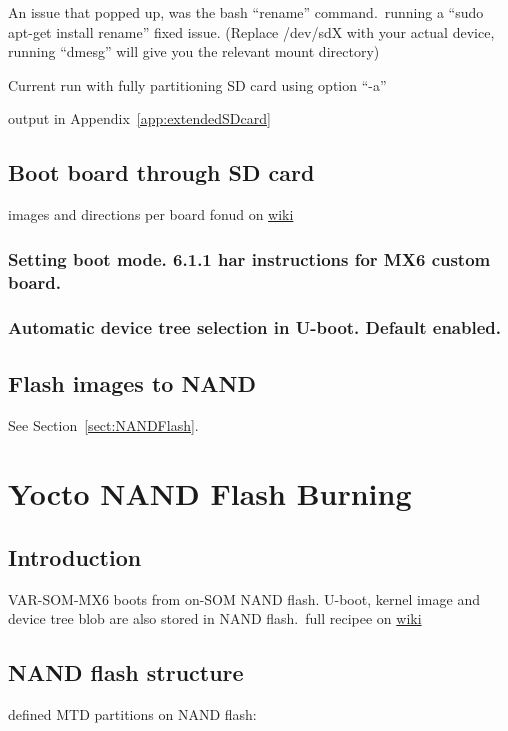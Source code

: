 \documentclass[10pt]{article}
\begin{document}
An issue that popped up, was the bash ``rename'' command.\ running a ``sudo apt-get install rename'' fixed issue.
(Replace /dev/sdX with your actual device, running ``dmesg'' will give you the relevant mount directory)

Current run with fully partitioning SD card using option ``-a''

output in Appendix~\ref{app:extendedSDcard}

\subsection{Boot board through SD card}
images and directions per board fonud on
\href{http://variwiki.com/index.php?title=Yocto_Build_Release&release=RELEASE_SUMO_V1.1_VAR-SOM-MX6#Boot_the_board_with_a_bootable_SD_card}{wiki}

\subsubsection{Setting boot mode. 6.1.1 har instructions for MX6 custom board.}

\subsubsection{Automatic device tree selection in U-boot. Default enabled.}

\subsection{Flash images to NAND}
See Section~\ref{sect:NANDFlash}.


\section{Yocto NAND Flash Burning\label{sect:NANDFlash}}
\subsection{Introduction}
VAR-SOM-MX6 boots from on-SOM NAND flash. U-boot, kernel image and device tree blob are also stored in NAND flash.\
full recipee on \href{http://variwiki.com/index.php?title=Yocto_NAND_Flash_Burning&release=RELEASE_SUMO_V1.1_VAR-SOM-MX6}{wiki}

\subsection{NAND flash structure}
defined MTD partitions on NAND flash:

\end{document}
